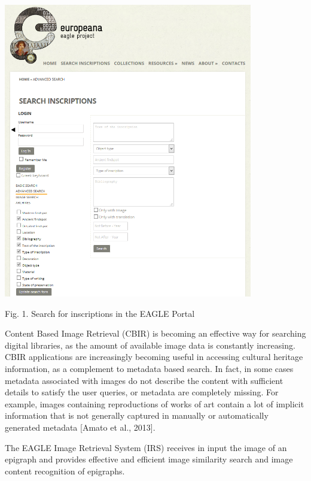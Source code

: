 \bigskip

 \includegraphics[width=10.874cm,height=12.885cm]{EAGLE2016submissionXX-img001.png} 

Fig. 1. Search for inscriptions in the EAGLE Portal


\bigskip

Content Based Image Retrieval (CBIR) is becoming an effective way for searching digital libraries, as the amount of
available image data is constantly increasing. CBIR applications are increasingly becoming useful in accessing cultural
heritage information, as a complement to metadata based search. In fact, in some cases metadata associated with images
do not describe the content with sufficient details to satisfy the user queries, or metadata are completely missing.
For example, images containing reproductions of works of art contain a lot of implicit information that is not
generally captured in manually or automatically generated metadata [Amato et al., 2013].

The EAGLE Image Retrieval System (IRS) receives in input the image of an epigraph and provides effective and efficient
image similarity search and image content recognition of epigraphs.


\bigskip

